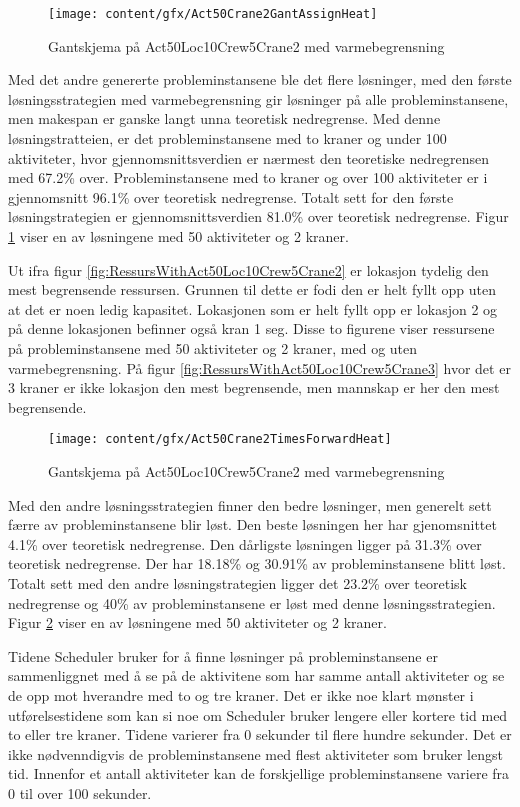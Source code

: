 \begin{figure}[!h]
\centering
\texttt{[image: content/gfx/Act50Crane2GantAssignHeat]}
\caption{Gantskjema på Act50Loc10Crew5Crane2 med varmebegrensning}
\label{fig:GantWithAct50Loc10Crew5Crane2AssignHeat}
\end{figure}
Med det andre genererte probleminstansene ble det flere løsninger, med den første løsningsstrategien med varmebegrensning gir løsninger på alle probleminstansene, men makespan er ganske langt unna teoretisk nedregrense. Med denne løsningstratteien, er det probleminstansene med to kraner og under 100 aktiviteter, hvor gjennomsnittsverdien er nærmest den teoretiske nedregrensen med 67.2\% over. Probleminstansene med to kraner og over 100 aktiviteter er i gjennomsnitt 96.1\% over teoretisk nedregrense. Totalt sett for den første løsningstrategien er gjennomsnittsverdien 81.0\% over teoretisk nedregrense. Figur \ref{fig:GantWithAct50Loc10Crew5Crane2AssignHeat} viser en av løsningene med 50 aktiviteter og 2 kraner.

Ut ifra figur \ref{fig:RessursWithAct50Loc10Crew5Crane2} er lokasjon tydelig den mest begrensende ressursen. Grunnen til dette er fodi den er helt fyllt opp uten at det er noen ledig kapasitet. Lokasjonen som er helt fyllt opp er lokasjon 2 og på denne lokasjonen befinner også kran 1 seg. Disse to figurene viser ressursene på probleminstansene med 50 aktiviteter og 2 kraner, med og uten varmebegrensning. På figur \ref{fig:RessursWithAct50Loc10Crew5Crane3} hvor det er 3 kraner er ikke lokasjon den mest begrensende, men mannskap er her den mest begrensende.

\begin{figure}[!h]
\centering
\texttt{[image: content/gfx/Act50Crane2TimesForwardHeat]}
\caption{Gantskjema på Act50Loc10Crew5Crane2 med varmebegrensning}
\label{fig:GantWithAct50Loc10Crew5Crane2TFHeat}
\end{figure}
Med den andre løsningsstrategien finner den bedre løsninger, men generelt sett færre av probleminstansene blir løst. Den beste løsningen her har gjenomsnittet 4.1\% over teoretisk nedregrense. Den dårligste løsningen ligger på 31.3\% over teoretisk nedregrense. Der har 18.18\% og 30.91\% av probleminstansene blitt løst. Totalt sett med den andre løsningstrategien ligger det 23.2\% over teoretisk nedregrense og 40\% av probleminstansene er løst med denne løsningsstrategien. Figur \ref{fig:GantWithAct50Loc10Crew5Crane2TFHeat} viser en av løsningene med 50 aktiviteter og 2 kraner.

Tidene Scheduler bruker for å finne løsninger på probleminstansene er sammenliggnet med å se på de aktivitene som har samme antall aktiviteter og se de opp mot hverandre med to og tre kraner. Det er ikke noe klart mønster i utførelsestidene som kan si noe om Scheduler bruker lengere eller kortere tid med to eller tre kraner. Tidene varierer fra 0 sekunder til flere hundre sekunder. Det er ikke nødvenndigvis de probleminstansene med flest aktiviteter som bruker lengst tid. Innenfor et antall aktiviteter kan de forskjellige probleminstansene variere fra 0 til over 100 sekunder.